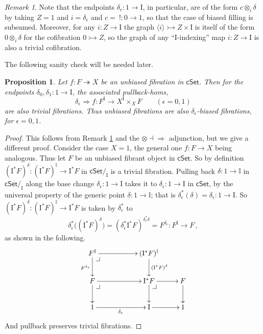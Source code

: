 \documentclass[11pt]{amsart}
\makeatletter
\newcommand{\cSet}{\ensuremath{\mathsf{cSet}}}
\newcommand{\mono}{\ensuremath{\rightarrowtail}}
\newcommand{\ra}{\ensuremath{\rightarrow}}
\newcommand{\cof}{\ensuremath{\rightarrowtail}}
\newcommand{\fib}{\ensuremath{\twoheadrightarrow}}
\renewcommand{\to}{\ensuremath{\rightarrow}}
\newcommand{\too}{\ensuremath{\longrightarrow}}
\newcommand{\gph}[1]{\ensuremath{\langle #1 \rangle}}
\newcommand{\I}{\ensuremath{\mathrm{I}}}
\newcommand{\II}{\ensuremath{\mathbb{I}}}
\newtheorem{proposition}[theorem]{Proposition}
\theoremstyle{remark}
\newtheorem{remark}[theorem]{Remark}
\theoremstyle{definition}
\newcommand{\pbcorner}[1][dr]{\save*!/#1-1.2pc/#1:(-1,1)@^{|-}\restore}
\makeatother
\begin{document}
\begin{remark}\label{rem:specialtrivcofs}
Note that the endpoints $\delta_\epsilon : 1 \ra \I$, in particular, are of the form $c \otimes_i\!\delta$ by taking $Z = 1$ and $i = \delta_\epsilon$ and $c =\ ! : 0 \ra 1$, so that the case of biased filling is subsumed.  Moreover, for any $i : Z\to \I$ the graph $\gph{i} \mono Z\times \I$ is itself of the form $0 \otimes_i\!\delta$ for the cofibration $0 \cof Z$, so the graph of any ``$\I$-indexing'' map $i : Z\to\I$ is also a trivial cofibration.
\end{remark}

The following sanity check will be needed later.
\begin{proposition}\label{prop:sanitycheck}
Let $f:F\fib X$ be an unbiased fibration in $\cSet$. Then for the endpoints $\delta_0, \delta_1 : 1 \to \I$, the associated pullback-homs,
\begin{equation}\label{eq:unbiasedimpliesbiased}
\delta_\epsilon \Rightarrow f : F^\I \to X^\I \times_X F \qquad(\epsilon = 0,1)
\end{equation}
are also trivial fibrations. Thus unbiased fibrations are also $\delta_\epsilon$-biased fibrations, for $\epsilon=0,1$.
%
\end{proposition}

\begin{proof}
This follows from Remark \ref{rem:specialtrivcofs} and the ${\otimes} \dashv {\Rightarrow}$ adjunction, but we give a different proof.
Consider the case $X=1$, the general one $f:F\to X$ being analogous. Thus let $F$ be an unbiased fibrant object in $\cSet$. So by definition $(\I^*F)^\delta : (\I^*F)^\II \too \I^*F$  in $\cSet/_\I$ is a trivial fibration. %
Pulling back $\delta : 1\to \II$ in $\cSet/_\I$ along the base change $\delta_\epsilon : 1\to \I$ takes it to $\delta_\epsilon : 1\to \I$ in $\cSet$, by the universal property of the generic point $\delta : 1\to \II$; that is $\delta_\epsilon^*(\delta) = \delta_\epsilon : 1 \to \I$.  So $(\I^*F)^\delta : (\I^*F)^\II \too \I^*F$ is taken by $\delta_\epsilon^*$ to
\[
\delta_\epsilon^* \big( {(\I^*F)^\delta} \big) =
(\delta_\epsilon^*\I^*F)^{\delta_\epsilon^*\delta} =  F^{\delta_\epsilon} : F^\I \too F\,,
\]
as shown in the following.
\begin{equation}\label{diagram:unbiasedfibration}
\xymatrix{
F^\I \ar[d]_{F^{\delta_\epsilon}} \ar[rr] \pbcorner && (\I^* F)^{\II} \ar[d]^{(\I^*F)^{\delta}} &  \\
 F \ar[d] \ar[rr] \pbcorner && \I^*F \ar[d]  \ar[r] \pbcorner & F \ar[d]  \\
 1 \ar[rr]_{\delta_\epsilon} &&  \I \ar[r] & 1
}
\end{equation}
And pullback preserves trivial fibrations. 
\end{proof}
\end{document}
